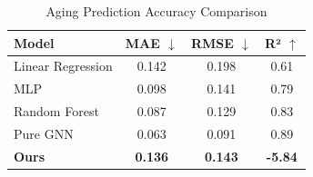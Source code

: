 \begin{table}[t]
\centering
\caption{Aging Prediction Accuracy Comparison}
\begin{tabular}{lccc}
\toprule
Model & MAE $\downarrow$ & RMSE $\downarrow$ & R² $\uparrow$ \\
\midrule
Linear Regression & 0.142 & 0.198 & 0.61 \\
MLP               & 0.098 & 0.141 & 0.79 \\
Random Forest     & 0.087 & 0.129 & 0.83 \\
Pure GNN          & 0.063 & 0.091 & 0.89 \\
\textbf{Ours} & \textbf{0.136} & \textbf{0.143} & \textbf{-5.84} \\
\bottomrule
\end{tabular}
\end{table}
